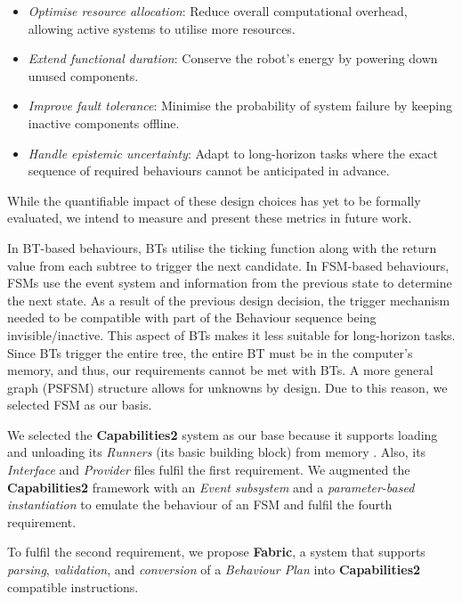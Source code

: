 \documentclass[letterpaper, 10pt, conference]{ieeeconf}      %
\begin{document}
\begin{itemize}
    \item \textit{Optimise resource allocation}: Reduce overall computational overhead, allowing active systems to utilise more resources.
    \item \textit{Extend functional duration}: Conserve the robot's energy by powering down unused components.
    \item \textit{Improve fault tolerance}: Minimise the probability of system failure by keeping inactive components offline.
    \item \textit{Handle epistemic uncertainty}: Adapt to long-horizon tasks where the exact sequence of required behaviours cannot be anticipated in advance.
\end{itemize}

While the quantifiable impact of these design choices has yet to be formally evaluated, we intend to measure and present these metrics in future work.

In BT-based behaviours, BTs utilise the ticking function along with the return value from each subtree to trigger the next candidate. In FSM-based behaviours, FSMs use the event system and information from the previous state to determine the next state. As a result of the previous design decision, the trigger mechanism needed to be compatible with part of the Behaviour sequence being invisible/inactive. This aspect of BTs makes it less suitable for long-horizon tasks. Since BTs trigger the entire tree, the entire BT must be in the computer's memory, and thus, our requirements cannot be met with BTs. A more general graph (PSFSM) structure allows for unknowns by design. Due to this reason, we selected FSM as our basis.

We selected the \textbf{Capabilities2} system as our base because it supports loading and unloading its \textit{Runners} (its basic building block) from memory \cite{pritchard_capabilities2_2025}. Also, its \textit{Interface} and \textit{Provider} files fulfil the first requirement. We augmented the \textbf{Capabilities2} framework with an \textit{Event subsystem} and a \textit{parameter-based instantiation} to emulate the behaviour of an FSM and fulfil the fourth requirement.

To fulfil the second requirement, we propose \textbf{Fabric}, a system that supports \textit{parsing}, \textit{validation}, and \textit{conversion} of a \textit{Behaviour Plan} into \textbf{Capabilities2} compatible instructions. 
\end{document}
